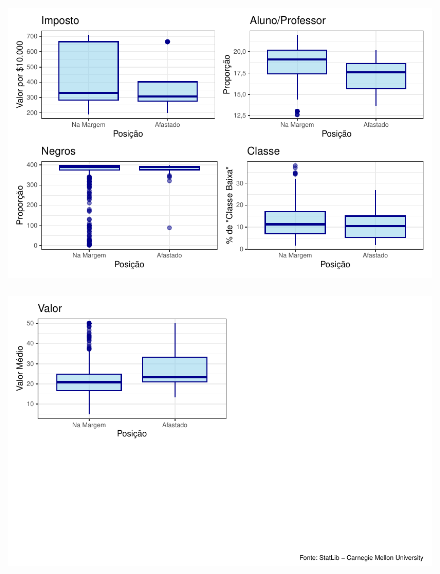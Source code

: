 \documentclass[
  letterpaper,
]{report}
\begin{document}
\begin{figure}[H]

{\centering \includegraphics{Parte-1_files/figure-pdf/unnamed-chunk-4-3.pdf}

}

\end{figure}

\begin{figure}[H]

{\centering \includegraphics{Parte-1_files/figure-pdf/unnamed-chunk-4-4.pdf}

}

\end{figure}
\end{document}
